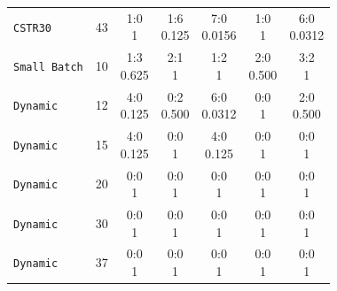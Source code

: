 \begin{tabular}{@{}lrccccc@{}}
\texttt{CSTR30} & 43 & \makecell{1:0\\1} & \makecell{1:6\\0.125} & \makecell{7:0\\0.0156} & \makecell{1:0\\1} & \makecell{6:0\\0.0312} \\
\texttt{Small Batch} & 10 & \makecell{1:3\\0.625} & \makecell{2:1\\1} & \makecell{1:2\\1} & \makecell{2:0\\0.500} & \makecell{3:2\\1} \\
\texttt{Dynamic} & 12 & \makecell{4:0\\0.125} & \makecell{0:2\\0.500} & \makecell{6:0\\0.0312} & \makecell{0:0\\1} & \makecell{2:0\\0.500} \\
\texttt{Dynamic} & 15 & \makecell{4:0\\0.125} & \makecell{0:0\\1} & \makecell{4:0\\0.125} & \makecell{0:0\\1} & \makecell{0:0\\1} \\
\texttt{Dynamic} & 20 & \makecell{0:0\\1} & \makecell{0:0\\1} & \makecell{0:0\\1} & \makecell{0:0\\1} & \makecell{0:0\\1} \\
\texttt{Dynamic} & 30 & \makecell{0:0\\1} & \makecell{0:0\\1} & \makecell{0:0\\1} & \makecell{0:0\\1} & \makecell{0:0\\1} \\
\texttt{Dynamic} & 37 & \makecell{0:0\\1} & \makecell{0:0\\1} & \makecell{0:0\\1} & \makecell{0:0\\1} & \makecell{0:0\\1} \\

\end{tabular}
